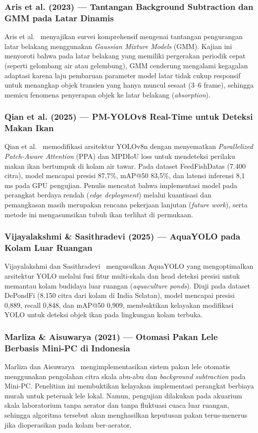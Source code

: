 \subsubsection{Aris et al. (2023) --- Tantangan Background Subtraction dan GMM pada Latar Dinamis}
Aris et al.~\cite{Aris2023} menyajikan survei komprehensif mengenai tantangan pengurangan latar belakang menggunakan \textit{Gaussian Mixture Models} (GMM). Kajian ini menyoroti bahwa pada latar belakang yang memiliki pergerakan periodik cepat (seperti gelombang air atau gelembung), GMM cenderung mengalami kegagalan adaptasi karena laju pembaruan parameter model latar tidak cukup responsif untuk menangkap objek transien yang hanya muncul sesaat (3--6 frame), sehingga memicu fenomena penyerapan objek ke latar belakang (\textit{absorption}).

\subsubsection{Qian et al. (2025) --- PM-YOLOv8 Real-Time untuk Deteksi Makan Ikan}
Qian et al.~\cite{Qian2025} memodifikasi arsitektur YOLOv8n dengan menyematkan \textit{Parallelized Patch-Aware Attention} (PPA) dan MPDIoU loss untuk mendeteksi perilaku makan ikan bertumpuk di kolam air tawar. Pada dataset FeedFishDatas (7.400 citra), model mencapai presisi 87,7\%, mAP@50 83,5\%, dan latensi inferensi 8,1 ms pada GPU pengujian. Penulis mencatat bahwa implementasi model pada perangkat berdaya rendah (\textit{edge deployment}) melalui kuantisasi dan pemangkasan masih merupakan rencana pekerjaan lanjutan (\textit{future work}), serta metode ini mengasumsikan tubuh ikan terlihat di permukaan.

\subsubsection{Vijayalakshmi \& Sasithradevi (2025) --- AquaYOLO pada Kolam Luar Ruangan}
Vijayalakshmi dan Sasithradevi~\cite{Vijayalakshmi2025} mengusulkan AquaYOLO yang mengoptimalkan arsitektur YOLO melalui fusi fitur multi-skala dan head deteksi presisi untuk memantau kolam budidaya luar ruangan (\textit{aquaculture ponds}). Diuji pada dataset DePondFi (8.150 citra dari kolam di India Selatan), model mencapai presisi 0,889, recall 0,848, dan mAP@50 0,909, membuktikan kelayakan modifikasi YOLO untuk deteksi objek ikan pada lingkungan kolam terbuka.

\subsubsection{Marliza \& Aisuwarya (2021) --- Otomasi Pakan Lele Berbasis Mini-PC di Indonesia}
Marliza dan Aisuwarya~\cite{Marliza2021} mengimplementasikan sistem pakan lele otomatis menggunakan pengolahan citra skala abu-abu dan \textit{background subtraction} pada Mini-PC. Penelitian ini membuktikan kelayakan implementasi perangkat berbiaya murah untuk peternak lele lokal. Namun, pengujian dilakukan pada akuarium skala laboratorium tanpa aerator dan tanpa fluktuasi cuaca luar ruangan, sehingga algoritma tersebut akan menghasilkan keputusan pakan terus-menerus jika dioperasikan pada kolam ber-aerator.

